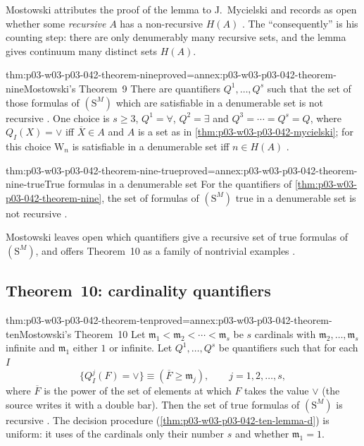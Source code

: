 Mostowski attributes the proof of the lemma to J.~Mycielski and records as
open whether some \emph{recursive} \(A\) has a non-recursive \(H(A)\)
\cite[p.~28, note~10]{Mostowski1957}.  The ``consequently'' is his
counting step: there are only denumerably many recursive sets, and the
lemma gives continuum many distinct sets \(H(A)\).

\begin{hbtheorem}{thm:p03-w03-p03-042-theorem-nine}{proved=annex:p03-w03-p03-042-theorem-nine}{Mostowski's Theorem~9}
There are quantifiers \(Q^1,\ldots,Q^s\) such that the set of those
formulas of \((\mathrm S^M)\) which are satisfiable in a denumerable set
is not recursive \cite[p.~28]{Mostowski1957}.  One choice is
\(s\geq3\), \(Q^1=\forall\), \(Q^2=\exists\) and
\(Q^3=\cdots=Q^s=Q\), where \(Q_I(X)=\vee\) iff \(\overline X\in A\) and
\(A\) is a set as in \cref{thm:p03-w03-p03-042-mycielski}; for this
choice \(\mathrm W_n\) is satisfiable in a denumerable set iff \(n\in
H(A)\) \cite[pp.~28--29]{Mostowski1957}.
\end{hbtheorem}

\begin{hbcorollary}{thm:p03-w03-p03-042-theorem-nine-true}{proved=annex:p03-w03-p03-042-theorem-nine-true}{True formulas in a denumerable set}
For the quantifiers of \cref{thm:p03-w03-p03-042-theorem-nine}, the set
of formulas of \((\mathrm S^M)\) true in a denumerable set is not
recursive \cite[p.~29]{Mostowski1957}.
\end{hbcorollary}

Mostowski leaves open which quantifiers give a recursive set of true
formulas of \((\mathrm S^M)\), and offers Theorem~10 as a family of
nontrivial examples \cite[p.~29]{Mostowski1957}.

\subsection{Theorem~10: cardinality quantifiers}

\begin{hbtheorem}{thm:p03-w03-p03-042-theorem-ten}{proved=annex:p03-w03-p03-042-theorem-ten}{Mostowski's Theorem~10}
Let \(\mathfrak m_1<\mathfrak m_2<\cdots<\mathfrak m_s\) be \(s\)
cardinals with \(\mathfrak m_2,\ldots,\mathfrak m_s\) infinite and
\(\mathfrak m_1\) either \(1\) or infinite.  Let \(Q^1,\ldots,Q^s\) be
quantifiers such that for each \(I\)
\[
 \{Q^j_I(F)=\vee\}\equiv(\overline F\geq\mathfrak m_j),
 \qquad j=1,2,\ldots,s,
\]
where \(\overline F\) is the power of the set of elements at which \(F\)
takes the value \(\vee\) (the source writes it with a double bar).  Then the set of true formulas of
\((\mathrm S^M)\) is recursive \cite[p.~29]{Mostowski1957}.  The decision
procedure (\cref{thm:p03-w03-p03-042-ten-lemma-d}) is uniform: it uses of
the cardinals only their number \(s\) and whether \(\mathfrak m_1=1\).
\end{hbtheorem}

